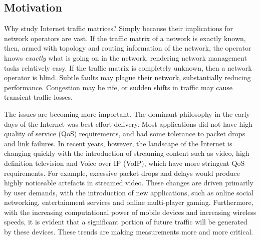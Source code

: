 

\subsection{Motivation}

Why study Internet traffic matrices? Simply because their implications
for network operators are vast. If the traffic matrix of a network is
exactly known, then, armed with topology and routing information of
the network, the operator knows \emph{exactly} what is going on in the
network, rendering network management tasks relatively easy. If the
traffic matrix is completely unknown, then a network operator is
blind. Subtle faults may plague their network, substantially reducing
performance. Congestion may be rife, or sudden shifts in traffic may
cause transient traffic losses. 

The issues are becoming more important.  The dominant philosophy in
the early days of the Internet was best effort delivery. Most
applications did not have high quality of service (QoS) requirements,
and had some tolerance to packet drops and link failures. In recent
years, however, the landscape of the Internet is changing quickly with
the introduction of streaming content such as video, high definition
television and Voice over IP (VoIP), which have more stringent QoS
requirements. For example, excessive packet drops and delays would
produce highly noticeable artefacts in streamed video. These changes
are driven primarily by user demands, with the introduction of new
applications, such as online social networking, entertainment services
and online multi-player gaming. Furthermore, with the increasing
computational power of mobile devices and increasing wireless speeds,
it is evident that a significant portion of future traffic will be
generated by these devices. These trends are making measurements more
and more critical.

